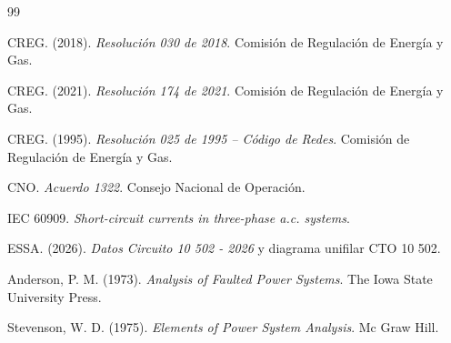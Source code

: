 \documentclass[12pt,a4paper,oneside]{book}
\begin{document}









\begin{thebibliography}{99}

 CREG. (2018). \textit{Resolución 030 de 2018}. Comisión de Regulación de Energía y Gas.

 CREG. (2021). \textit{Resolución 174 de 2021}. Comisión de Regulación de Energía y Gas.

 CREG. (1995). \textit{Resolución 025 de 1995 -- Código de Redes}. Comisión de Regulación de Energía y Gas.

 CNO. \textit{Acuerdo 1322}. Consejo Nacional de Operación.

 IEC 60909. \textit{Short-circuit currents in three-phase a.c. systems}.

 ESSA. (2026). \textit{Datos Circuito 10 502 - 2026} y diagrama unifilar CTO 10 502.

 Anderson, P. M. (1973). \textit{Analysis of Faulted Power Systems}. The Iowa State University Press.

 Stevenson, W. D. (1975). \textit{Elements of Power System Analysis}. Mc Graw Hill.

\end{thebibliography}

\appendix

\end{document}
